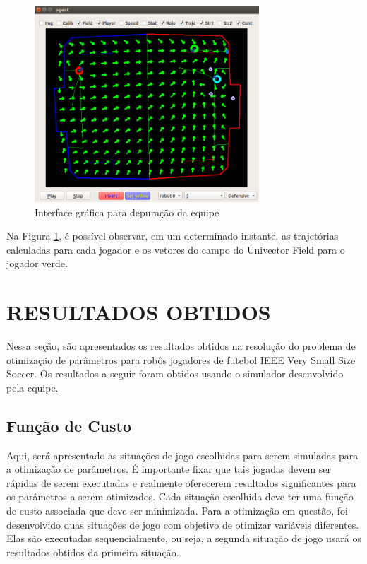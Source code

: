 \documentclass[10pt,fleqn,a4paper]{article}
\begin{document}
\begin{figure}[H]
	\centering
	\includegraphics[width=0.75\textwidth]{figures/UnivectorFieldSimulatorDebugger.png}
	\caption{Interface gráfica para depuração da equipe}
	\label{fig:univector}
\end{figure}

Na Figura \ref{fig:univector}, é possível observar, em um determinado instante, as trajetórias calculadas para cada jogador e os vetores do campo do Univector Field para o jogador verde.


    \section{RESULTADOS OBTIDOS}
Nessa seção, são apresentados os resultados obtidos na resolução do problema de otimização de parâmetros para robôs jogadores de futebol IEEE Very Small Size Soccer. Os resultados a seguir foram obtidos usando o simulador desenvolvido pela equipe.

\subsection{Função de Custo}

Aqui, será apresentado as situações de jogo escolhidas para serem simuladas para a otimização de parâmetros. É importante fixar que tais jogadas devem ser rápidas de serem executadas e realmente oferecerem resultados significantes para os parâmetros a serem otimizados. Cada situação escolhida deve ter uma função de custo associada que deve ser minimizada.
Para a otimização em questão, foi desenvolvido duas situações de jogo com objetivo de otimizar variáveis diferentes. Elas são executadas sequencialmente, ou seja, a segunda situação de jogo usará os resultados obtidos da primeira situação.
\end{document}
